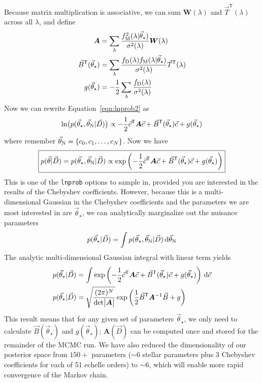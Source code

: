 \documentclass[preprint]{aastex} %
\newcommand{\vt}{\vec{\theta}}
\newcommand{\vstar}{\vt_{\star}}
\newcommand{\vN}{\vt_{\rm N}}
\newcommand{\vc}{\vec{c}}
\newcommand{\fM}{f_{\rm M}}
\newcommand{\fD}{f_{\rm D}}
\newcommand{\vD}{\vec{D}}
\newcommand{\dd}{\,{\rm d}}
\newcommand{\trans}{\mathsf{T}}
\begin{document}
Because matrix multiplication is associative, we can sum ${\bm W(\lambda)}$ and $\vec{T}^\trans(\lambda)$ across all $\lambda$, and define
\begin{align}
  {\bm A} &= \sum_\lambda \frac{\fM^2(\lambda|\vstar)}{\sigma^2(\lambda)} {\bm W}(\lambda)\\
  \vec{B}^\trans(\vstar) &= \sum_\lambda \frac{\fD(\lambda) \fM(\lambda | \vstar) }{\sigma^2(\lambda)} \vec{T}^\trans(\lambda)\\
  g(\vstar) &= -\frac{1}{2} \sum_\lambda \frac{\fD(\lambda)}{\sigma^2(\lambda)}\\
\end{align}
Now we can rewrite Equation~\ref{eqn:lnprob2} as 
\begin{equation}
  \ln \bigl (p(\vstar, \vN | \vD) \bigr) \propto - \frac{1}{2} \vc^\trans {\bm A} \vc + \vec{B}^\trans(\vstar) \vc + g(\vstar)
  \label{eqn:lnprob_matrix}
\end{equation}
where remember $\vN = \{c_0, c_1, \ldots, c_N \}$. Now we have
\begin{equation}
  \boxed{
  p(\vt | \vD) = p(\vstar, \vN | \vD) \propto \exp \left ( - \frac{1}{2} \vc^\trans {\bm A} \vc + \vec{B}^\trans(\vstar) \vc + g(\vstar) \right )
}
  \label{eqn:posterior_vec}
\end{equation}
This is one of the \texttt{lnprob} options to sample in, provided you are interested in the results of the Chebyshev coefficients. However, because this is a multi-dimensional Gaussian in the Chebyshev coefficients and the parameters we are most interested in are $\vstar$, we can analytically marginalize out the nuisance parameters
\begin{equation}
  p(\vstar | \vD) = \int p(\vstar, \vN | \vD) \dd \vN
\end{equation}
The analytic multi-dimensional Gaussian integral with linear term \citep{sgd+09} yields 
\begin{align}
  p(\vstar | \vD) &= \int \exp \left ( - \frac{1}{2} \vc^\trans {\bm A} \vc + \vec{B}^\trans(\vstar) \vc + g(\vstar) \right ) \dd \vc\\
  p(\vstar | \vD) &= \sqrt{\frac{(2 \pi )^N}{ {\rm det} \bigl |{\bm A} \bigr |}} \exp{ \left ( \frac{1}{2} \vec{B}^\trans {\bm A}^{-1} \vec{B} + g \right )}
\end{align}
This result means that for any given set of parameters $\vstar$, we only need to calculate $\vec{B}(\vstar)$ and $g(\vstar)$; ${\bm A}(\vD)$ can be computed once and stored for the remainder of the MCMC run. We have also reduced the dimensionality of our posterior space from $150+$ parameters ($\sim 6$ stellar parameters plus 3 Chebyshev coefficients for each of 51 echelle orders) to $\sim 6$, which will enable more rapid convergence of the Markov chain.
\end{document}
